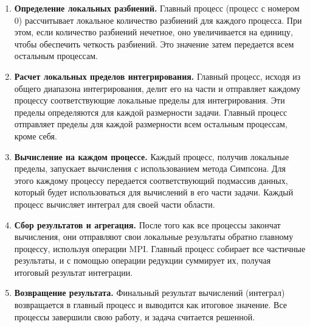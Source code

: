 \documentclass{report}
\begin{document}
\begin{enumerate}

    \item \textbf{Определение локальных разбиений.}
    Главный процесс (процесс с номером 0) рассчитывает локальное количество разбиений для каждого процесса. При этом, если количество разбиений нечетное, оно увеличивается на единицу, чтобы обеспечить четкость разбиений. Это значение затем передается всем остальным процессам.

    \item \textbf{Расчет локальных пределов интегрирования.}
    Главный процесс, исходя из общего диапазона интегрирования, делит его на части и отправляет каждому процессу соответствующие локальные пределы для интегрирования. Эти пределы определяются для каждой размерности задачи. Главный процесс отправляет пределы для каждой размерности всем остальным процессам, кроме себя.

    \item \textbf{Вычисление на каждом процессе.}
    Каждый процесс, получив локальные пределы, запускает вычисления с использованием метода Симпсона. Для этого каждому процессу передается соответствующий подмассив данных, который будет использоваться для вычислений в его части задачи. Каждый процесс вычисляет интеграл для своей части области.

    \item \textbf{Сбор результатов и агрегация.}
    После того как все процессы закончат вычисления, они отправляют свои локальные результаты обратно главному процессу, используя операции MPI. Главный процесс собирает все частичные результаты, и с помощью операции редукции суммирует их, получая итоговый результат интеграции.

    \item \textbf{Возвращение результата.}
    Финальный результат вычислений (интеграл) возвращается в главный процесс и выводится как итоговое значение. Все процессы завершили свою работу, и задача считается решенной.

\end{enumerate}
\end{document}
